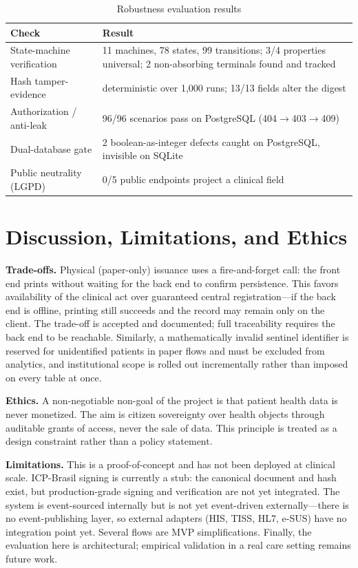 \documentclass[conference]{IEEEtran}
\begin{document}
\begin{table}[t]
\caption{Robustness evaluation results}
\label{tab:eval}
\centering
\footnotesize
\renewcommand{\arraystretch}{1.25}
\begin{tabular}{|p{2.3cm}|p{5.4cm}|}
\hline
\textbf{Check} & \textbf{Result} \\
\hline
State-machine verification & 11 machines, 78 states, 99 transitions; 3/4 properties universal; 2 non-absorbing terminals found and tracked \\
\hline
Hash tamper-evidence & deterministic over 1{,}000 runs; 13/13 fields alter the digest \\
\hline
Authorization / anti-leak & 96/96 scenarios pass on PostgreSQL (404$\rightarrow$403$\rightarrow$409) \\
\hline
Dual-database gate & 2 boolean-as-integer defects caught on PostgreSQL, invisible on SQLite \\
\hline
Public neutrality (LGPD) & 0/5 public endpoints project a clinical field \\
\hline
\end{tabular}
\end{table}

\section{Discussion, Limitations, and Ethics}\label{sec:disc}
\textbf{Trade-offs.} Physical (paper-only) issuance uses a fire-and-forget call: the front end prints without waiting for the back end to confirm persistence. This favors availability of the clinical act over guaranteed central registration---if the back end is offline, printing still succeeds and the record may remain only on the client. The trade-off is accepted and documented; full traceability requires the back end to be reachable. Similarly, a mathematically invalid sentinel identifier is reserved for unidentified patients in paper flows and must be excluded from analytics, and institutional scope is rolled out incrementally rather than imposed on every table at once.

\textbf{Ethics.} A non-negotiable non-goal of the project is that patient health data is never monetized. The aim is citizen sovereignty over health objects through auditable grants of access, never the sale of data. This principle is treated as a design constraint rather than a policy statement.

\textbf{Limitations.} This is a proof-of-concept and has not been deployed at clinical scale. ICP-Brasil signing is currently a stub: the canonical document and hash exist, but production-grade signing and verification are not yet integrated. The system is event-sourced internally but is not yet event-driven externally---there is no event-publishing layer, so external adapters (HIS, TISS, HL7, e-SUS) have no integration point yet. Several flows are MVP simplifications. Finally, the evaluation here is architectural; empirical validation in a real care setting remains future work.
\end{document}

